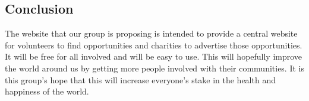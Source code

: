 \documentclass[12pt]{article}
\begin{document}
\subsection{Conclusion}
The website that our group is proposing is intended to provide a central website for volunteers to find opportunities and charities to advertise those opportunities.  It will be free for all involved and will be easy to use.  This will hopefully improve the world around us by getting more people involved with their communities. It is this group’s hope that this will increase everyone’s stake in the health and happiness of the world.  

\end{document}
